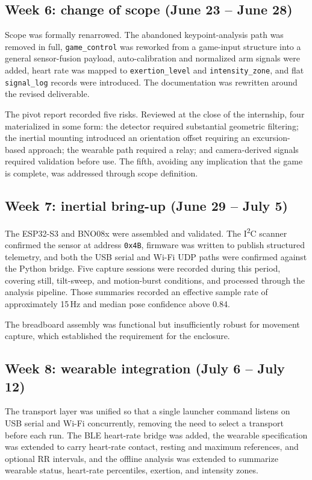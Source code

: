 \documentclass[11pt,a4paper]{article}
\newcommand{\code}[1]{\texttt{\small #1}}
\begin{document}
\subsection{Week 6: change of scope (June 23 -- June 28)}

Scope was formally renarrowed. The abandoned keypoint-analysis path was removed in
full, \code{game\_control} was reworked from a game-input structure into a general
sensor-fusion payload, auto-calibration and normalized arm signals were added,
heart rate was mapped to \code{exertion\_level} and \code{intensity\_zone}, and
flat \code{signal\_log} records were introduced. The documentation was rewritten
around the revised deliverable.

The pivot report recorded five risks. Reviewed at the close of the internship,
four materialized in some form: the detector required substantial geometric
filtering; the inertial mounting introduced an orientation offset requiring an
excursion-based approach; the wearable path required a relay; and camera-derived
signals required validation before use. The fifth, avoiding any implication that
the game is complete, was addressed through scope definition.

\subsection{Week 7: inertial bring-up (June 29 -- July 5)}

The ESP32-S3 and BNO08x were assembled and validated. The I\textsuperscript{2}C
scanner confirmed the sensor at address \code{0x4B}, firmware was written to
publish structured telemetry, and both the USB serial and Wi-Fi UDP paths were
confirmed against the Python bridge. Five capture sessions were recorded during
this period, covering still, tilt-sweep, and motion-burst conditions, and
processed through the analysis pipeline. Those summaries recorded an effective
sample rate of approximately 15\,Hz and median pose confidence above 0.84.

The breadboard assembly was functional but insufficiently robust for movement
capture, which established the requirement for the enclosure.

\subsection{Week 8: wearable integration (July 6 -- July 12)}

The transport layer was unified so that a single launcher command listens on USB
serial and Wi-Fi concurrently, removing the need to select a transport before each
run. The BLE heart-rate bridge was added, the wearable specification was extended
to carry heart-rate contact, resting and maximum references, and optional RR
intervals, and the offline analysis was extended to summarize wearable status,
heart-rate percentiles, exertion, and intensity zones.
\end{document}
